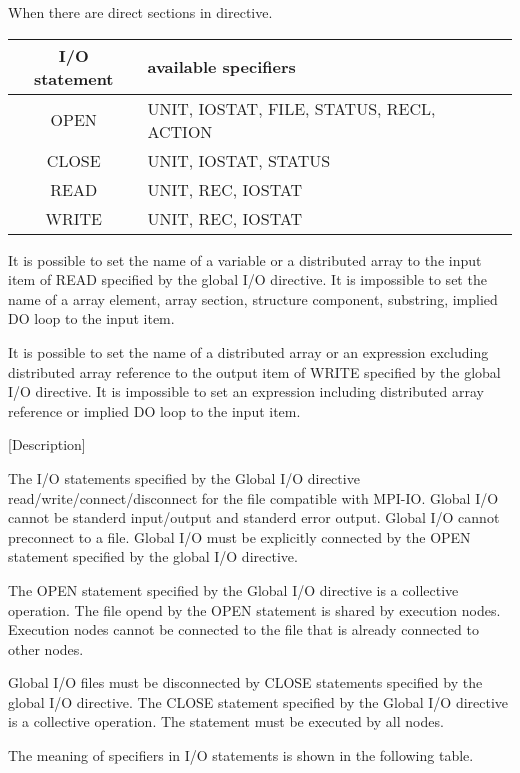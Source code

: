    When there are direct sections in directive.
   \begin{table}[h]
   \begin{center}
    \label{tb:globalstatement}
    \begin{tabular}{c|l}
     I/O statement & available specifiers \\ \hline
     OPEN & UNIT, IOSTAT, FILE, STATUS, RECL, ACTION \\
     CLOSE & UNIT, IOSTAT, STATUS \\
     READ & UNIT, REC, IOSTAT \\
     WRITE & UNIT, REC, IOSTAT \\
    \end{tabular}
   \end{center}
   \end{table}

   It is possible to set the name of a variable or a distributed array
   to the input item of READ specified by the global I/O directive.
   It is impossible to set the name of a array element, array section,
   structure component, substring, implied DO loop to the input item.

   It is possible to set the name of a distributed array or an
   expression excluding distributed array reference to the output item
   of WRITE specified by the global I/O directive. 
   It is impossible to set an expression including distributed array
   reference or implied DO loop to the input item.

   [Description]

   The I/O statements specified by the Global I/O directive
   read/write/connect/disconnect for the file compatible with MPI-IO.
   Global I/O cannot be standerd input/output and standerd error output.
   Global I/O cannot preconnect to a file. Global I/O must be explicitly
   connected by the OPEN statement specified by the global I/O
   directive.

   The OPEN statement specified by the Global I/O directive is
   a collective operation.
   The file opend by the OPEN statement is shared by execution nodes.
   Execution nodes cannot be connected to the file that is already
   connected to other nodes.

   Global I/O files must be disconnected by CLOSE statements specified by
   the global I/O directive.
   The CLOSE statement specified by the Global I/O directive is a
   collective operation.
   The statement must be executed by all nodes.

   The meaning of specifiers in I/O statements is shown in the following
   table.

